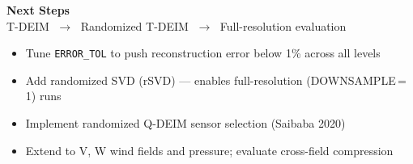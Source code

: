 \documentclass[aspectratio=169, 11pt]{beamer}
\begin{document}
\begin{frame}[standout]
  \large\textbf{Next Steps}\\[0.4em]
  \normalsize\textcolor{cteal!70!white}{%
    T-DEIM $\;\to\;$ Randomized T-DEIM $\;\to\;$ Full-resolution evaluation}

  \vspace{0.8em}
  \begin{itemize}\setlength\itemsep{0.45em}
    \item Tune \texttt{ERROR\_TOL} to push reconstruction error below 1\% across all levels
    \item Add randomized SVD (rSVD) — enables full-resolution (DOWNSAMPLE\,=\,1) runs
    \item Implement randomized Q-DEIM sensor selection (Saibaba 2020)
    \item Extend to V, W wind fields and pressure; evaluate cross-field compression
  \end{itemize}
\end{frame}

\end{document}
